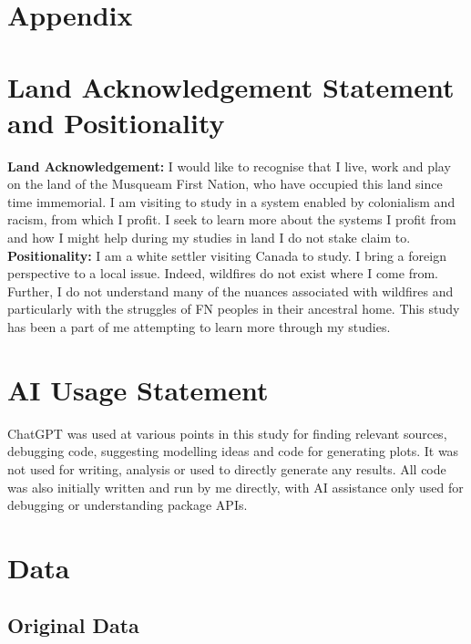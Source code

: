 \appendix
\section*{Appendix}
\section{Land Acknowledgement Statement and Positionality}
\textbf{Land Acknowledgement:}
I would like to recognise that I live, work and play on the land of the Musqueam First Nation, who have occupied this land since time immemorial. I am visiting to study in a system enabled by colonialism and racism, from which I profit. I seek to learn more about the systems I profit from and how I might help during my studies in land I do not stake claim to.\\
\textbf{Positionality:}
I am a white settler visiting Canada to study. I bring a foreign perspective to a local issue. Indeed, wildfires do not exist where I come from. Further, I do not understand many of the nuances associated with wildfires and particularly with the struggles of FN peoples in their ancestral home. This study has been a part of me attempting to learn more through my studies.

\section{AI Usage Statement}
ChatGPT was used at various points in this study for finding relevant sources, debugging code, suggesting modelling ideas and code for generating plots. It was not used for writing, analysis or used to directly generate any results. All code was also initially written and run by me directly, with AI assistance only used for debugging or understanding package APIs.

\section{Data}\label{sec:data_appendix}

\subsection{Original Data}

